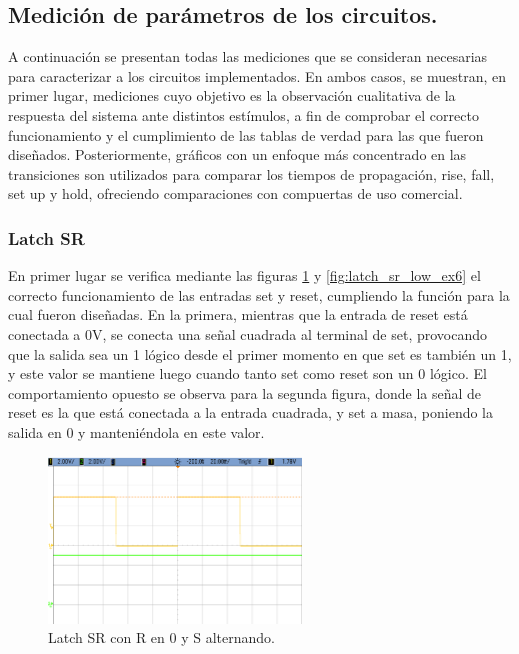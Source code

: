 \subsection{Medición de parámetros de los circuitos.}
A continuación se presentan todas las mediciones que se consideran necesarias para caracterizar a los circuitos implementados.
En ambos casos, se muestran, en primer lugar, mediciones cuyo objetivo es la observación cualitativa de la respuesta del sistema ante distintos estímulos, a fin de 
comprobar el correcto funcionamiento y el cumplimiento de las tablas de verdad para las que fueron diseñados.
Posteriormente, gráficos con un enfoque más concentrado en las transiciones son utilizados para comparar los tiempos de propagación, rise, fall, set up y hold, 
ofreciendo comparaciones con compuertas de uso comercial.


\subsubsection{Latch SR}
En primer lugar se verifica mediante las figuras \ref{fig:latch_sr_high_ex6} y \ref{fig:latch_sr_low_ex6} el correcto funcionamiento de las entradas set y reset, cumpliendo 
la función para la cual fueron diseñadas.
En la primera, mientras que la entrada de reset está conectada a 0V, se conecta una señal cuadrada al terminal de set, provocando que la salida sea un 1 lógico desde el 
primer momento en que set es también un 1, y este valor se mantiene luego cuando tanto set como reset son un 0 lógico.
El comportamiento opuesto se observa para la segunda figura, donde la señal de reset es la que está conectada a la entrada cuadrada, y set a masa, poniendo la salida en 0 
y manteniéndola en este valor.

\begin{figure}[H]
    \centering
    \includegraphics[width=0.6\textwidth]{../EJ6/Recursos/latch_sr_high}
    \caption{Latch SR con R en 0 y S alternando.}
    \label{fig:latch_sr_high_ex6}
\end{figure}

